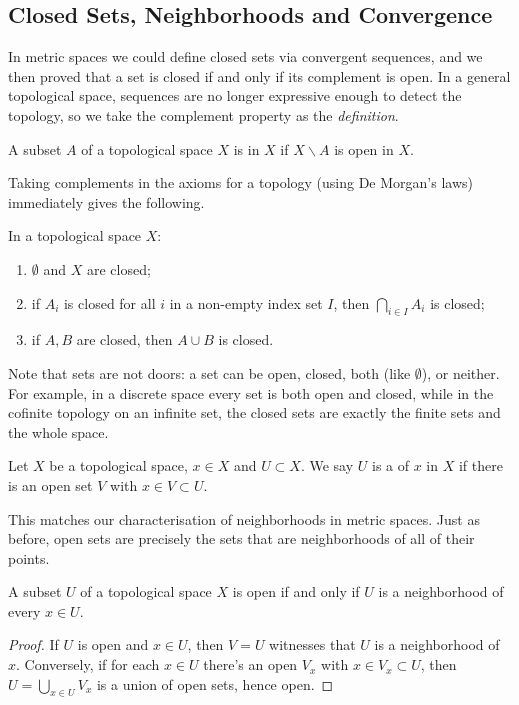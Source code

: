 \documentclass[a4paper]{scrartcl}
\begin{document}
\subsection{Closed Sets, Neighborhoods and Convergence}

In metric spaces we could define closed sets via convergent sequences, and we then proved that a set is closed if and only if its complement is open. In a general topological space, sequences are no longer expressive enough to detect the topology, so we take the complement property as the \emph{definition}.

\begin{definition}
    A subset $A$ of a topological space $X$ is  in $X$ if $X \backslash A$ is open in $X$.
\end{definition}

Taking complements in the axioms for a topology (using De Morgan's laws) immediately gives the following.

\begin{proposition}
    In a topological space $X$:
    \begin{enumerate}[label=(\roman*)]
        \item $\emptyset$ and $X$ are closed;
        \item if $A_i$ is closed for all $i$ in a non-empty index set $I$, then $\bigcap_{i \in I} A_i$ is closed;
        \item if $A, B$ are closed, then $A \cup B$ is closed.
    \end{enumerate}
\end{proposition}

Note that sets are not doors: a set can be open, closed, both (like $\emptyset$), or neither. For example, in a discrete space every set is both open and closed, while in the cofinite topology on an infinite set, the closed sets are exactly the finite sets and the whole space.

\begin{definition}[Neighborhood]
    Let $X$ be a topological space, $x \in X$ and $U \subset X$. We say $U$ is a  of $x$ in $X$ if there is an open set $V$ with $x \in V \subset U$.
\end{definition}

This matches our characterisation of neighborhoods in metric spaces. Just as before, open sets are precisely the sets that are neighborhoods of all of their points.

\begin{proposition}
    A subset $U$ of a topological space $X$ is open if and only if $U$ is a neighborhood of every $x \in U$.
\end{proposition}
\begin{proof}
    If $U$ is open and $x \in U$, then $V = U$ witnesses that $U$ is a neighborhood of $x$. Conversely, if for each $x \in U$ there's an open $V_x$ with $x \in V_x \subset U$, then $U = \bigcup_{x \in U} V_x$ is a union of open sets, hence open.
\end{proof}
\end{document}
